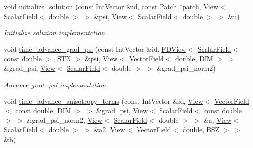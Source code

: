\begin{DoxyCompactItemize}
void \hyperlink{classUintah_1_1PhaseField_1_1PureMetal_acd2311b291f274ac2ba43accb04f34d8}{initialize\+\_\+solution} (const Int\+Vector \&id, const Patch $\ast$patch, \hyperlink{namespaceUintah_1_1PhaseField_a59210a1e28eba254d428762c92ddeabb}{View}$<$ \hyperlink{structUintah_1_1PhaseField_1_1ScalarField}{Scalar\+Field}$<$ double $>$ $>$ \&psi, \hyperlink{namespaceUintah_1_1PhaseField_a59210a1e28eba254d428762c92ddeabb}{View}$<$ \hyperlink{structUintah_1_1PhaseField_1_1ScalarField}{Scalar\+Field}$<$ double $>$ $>$ \&u)
\begin{DoxyCompactList}\small\item\em Initialize solution implementation. \end{DoxyCompactList}\item 
void \hyperlink{classUintah_1_1PhaseField_1_1PureMetal_ac401fde1e5bd2fd860137dcb885d4137}{time\+\_\+advance\+\_\+grad\+\_\+psi} (const Int\+Vector \&id, \hyperlink{namespaceUintah_1_1PhaseField_a63032464b1cd54eaa53c1c29109746ac}{F\+D\+View}$<$ \hyperlink{structUintah_1_1PhaseField_1_1ScalarField}{Scalar\+Field}$<$ const double $>$, S\+TN $>$ \&psi, \hyperlink{namespaceUintah_1_1PhaseField_a59210a1e28eba254d428762c92ddeabb}{View}$<$ \hyperlink{structUintah_1_1PhaseField_1_1VectorField}{Vector\+Field}$<$ double, D\+IM $>$ $>$ \&grad\+\_\+psi, \hyperlink{namespaceUintah_1_1PhaseField_a59210a1e28eba254d428762c92ddeabb}{View}$<$ \hyperlink{structUintah_1_1PhaseField_1_1ScalarField}{Scalar\+Field}$<$ double $>$ $>$ \&grad\+\_\+psi\+\_\+norm2)
\begin{DoxyCompactList}\small\item\em Advance grad\+\_\+psi implementation. \end{DoxyCompactList}\item 
void \hyperlink{classUintah_1_1PhaseField_1_1PureMetal_afa4afb2baaeb994ffcd006828689ff7d}{time\+\_\+advance\+\_\+anisotropy\+\_\+terms} (const Int\+Vector \&id, \hyperlink{namespaceUintah_1_1PhaseField_a59210a1e28eba254d428762c92ddeabb}{View}$<$ \hyperlink{structUintah_1_1PhaseField_1_1VectorField}{Vector\+Field}$<$ const double, D\+IM $>$ $>$ \&grad\+\_\+psi, \hyperlink{namespaceUintah_1_1PhaseField_a59210a1e28eba254d428762c92ddeabb}{View}$<$ \hyperlink{structUintah_1_1PhaseField_1_1ScalarField}{Scalar\+Field}$<$ const double $>$ $>$ \&grad\+\_\+psi\+\_\+norm2, \hyperlink{namespaceUintah_1_1PhaseField_a59210a1e28eba254d428762c92ddeabb}{View}$<$ \hyperlink{structUintah_1_1PhaseField_1_1ScalarField}{Scalar\+Field}$<$ double $>$ $>$ \&a, \hyperlink{namespaceUintah_1_1PhaseField_a59210a1e28eba254d428762c92ddeabb}{View}$<$ \hyperlink{structUintah_1_1PhaseField_1_1ScalarField}{Scalar\+Field}$<$ double $>$ $>$ \&a2, \hyperlink{namespaceUintah_1_1PhaseField_a59210a1e28eba254d428762c92ddeabb}{View}$<$ \hyperlink{structUintah_1_1PhaseField_1_1VectorField}{Vector\+Field}$<$ double, B\+SZ $>$ $>$ \&b)

\end{DoxyCompactItemize}
